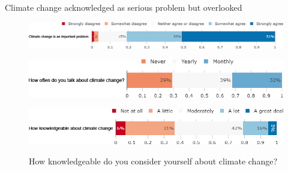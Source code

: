 \begin{framefont}{\small}
\begin{frame}{Climate change acknowledged as serious problem but overlooked}%
\begin{figure}[h!]
\centering
\caption{Do you agree or disagree with the following statement: ``Climate change is an important problem."}
\includegraphics[width=.78\paperwidth]{../figures/FR/CC_problem_FR.png}
\caption{How often do you think or talk with people about climate change?}
\includegraphics[width=.61\paperwidth]{../figures/FR/CC_talks_FR.png}\\
\centering
\caption{How knowledgeable do you consider yourself about climate change?}
\includegraphics[width=.7\paperwidth]{../figures/FR/CC_knowledgeable_FR.png}
\\
\end{figure}
\end{frame}


\end{framefont}
